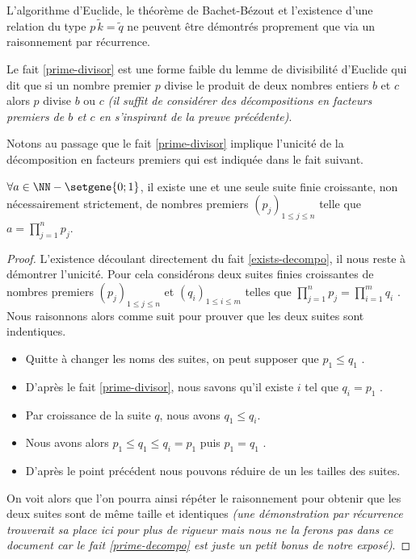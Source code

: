 \begin{unproved}
	L'algorithme d'Euclide, le théorème de Bachet-Bézout et l'existence d'une relation du type $p \, \widetilde{k} = \widetilde{q}$ ne peuvent être démontrés proprement que via un raisonnement par récurrence.

\end{unproved}


\begin{remark}
	Le fait \ref{prime-divisor} est une forme faible du lemme de divisibilité d'Euclide qui dit que si un nombre premier $p$ divise le produit de deux nombres entiers $b$ et $c$ alors $p$ divise $b$ ou $c$ \emph{(il suffit de considérer des décompositions en facteurs premiers de $b$ et $c$ en s'inspirant de la preuve précédente)}.  
\end{remark}


Notons au passage que le fait \ref{prime-divisor} implique l'unicité de la décomposition en facteurs premiers qui est indiquée dans le fait suivant.

\begin{fact} \label{prime-decompo}
	$\forall a \in \NN - \setgene{0 ; 1}$, il existe une et une seule suite finie croissante, non nécessairement strictement, de nombres premiers $(p_j)_{1 \leq j \leq n}$
	telle que $\displaystyle a = \prod_{j=1}^{n} p_j$. 
\end{fact}
	

\begin{proof}
	L'existence découlant directement du fait \ref{exists-decompo}, il nous reste à démontrer l'unicité.
	Pour cela considérons deux suites finies croissantes de nombres premiers
	$(p_j)_{1 \leq j \leq n}$
	et
	$(q_i)_{1 \leq i \leq m}$
	telles que $\displaystyle \prod_{j=1}^{n} p_j = \prod_{i=1}^{m} q_i$ .
	Nous raisonnons alors comme suit pour prouver que les deux suites sont indentiques.
	
	\begin{itemize}[label=\small\textbullet]
		\item Quitte à changer les noms des suites, on peut supposer que $p_1 \leq q_1$ .
		

		\item D'après le fait \ref{prime-divisor}, nous savons qu'il existe $i$ tel que $q_i = p_1$ .
	
		\item Par croissance de la suite $q$, nous avons $q_1 \leq q_i$.
		
		\item Nous avons alors $p_1 \leq q_1 \leq q_i = p_1$ puis $p_1 = q_1$ .
		
		\item D'après le point précédent nous pouvons réduire de un les tailles des suites.
	\end{itemize}
	
	On voit alors que l'on pourra ainsi répéter le raisonnement pour obtenir que les deux suites sont de même taille et identiques \emph{(une démonstration par récurrence trouverait sa place ici pour plus de rigueur mais nous ne la ferons pas dans ce document car le fait \ref{prime-decompo} est juste un petit bonus de notre exposé)}.
\end{proof}
